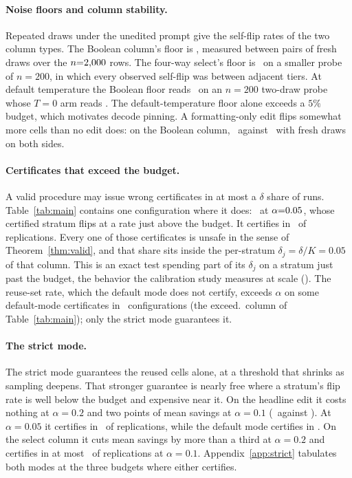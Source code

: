 \keeprunin
\paragraph{Noise floors and column stability.} Repeated draws under the
unedited prompt give the self-flip rates of the two column types. The Boolean column's floor
is \floorBool, measured between pairs of fresh draws over the
$n{=}2{,}000$ rows. The four-way select's floor is \floorSelect\ on a
smaller probe of $n{=}200$, in which every observed self-flip was
between adjacent tiers. At default temperature the Boolean floor reads
\floorDefaultT\ on an $n{=}200$ two-draw probe whose $T{=}0$ arm reads
\floorTzeroProbe. The default-temperature floor alone exceeds a $5\%$
budget, which motivates decode pinning. A formatting-only edit flips
somewhat more cells than no edit does: on the Boolean column,
\editFlipFreshBoth\ against \floorBool\ with fresh draws on both
sides.

\keeprunin
\paragraph{Certificates that exceed the budget.} A valid procedure
may issue wrong certificates in at most a $\delta$ share of runs.
Table~\ref{tab:main} contains one configuration where it does:
\tableUnsafeWorstPair\ at $\alpha{=}0.05$, whose
certified stratum flips at a rate just above the budget. It certifies
in \tableUnsafeWorstCert\ of replications. Every one of those
certificates is unsafe in the sense of Theorem~\ref{thm:valid}, and
that share sits inside the per-stratum $\delta_j = \delta/K = 0.05$ of
that column. This is an exact test spending part of its $\delta_j$ on a
stratum just past the budget, the behavior the calibration study
measures at scale (). The reuse-set rate,
which the default mode does not certify, exceeds $\alpha$ on some
default-mode certificates in \tableExceedConfigs\ configurations (the
exceed.\ column of Table~\ref{tab:main}); only the strict mode
guarantees it.

\keeprunin
\paragraph{The strict mode.} The strict mode guarantees the reused
cells alone, at a threshold that shrinks as sampling deepens. That
stronger guarantee is nearly free where a stratum's flip rate is well
below the budget and expensive near it. On the headline edit it costs
nothing at $\alpha{=}0.2$ and two points of mean savings at
$\alpha{=}0.1$ (\reuseSetSavingsTight\ against \frontierB). At
$\alpha{=}0.05$ it certifies in \reuseSetCertEdge\ of replications,
while the default mode certifies in \edgeCertRate. On the select column
it cuts mean savings by more than a third at $\alpha{=}0.2$ and
certifies in at most \reuseSetDjCertTightMax\ of replications at
$\alpha{=}0.1$. Appendix~\ref{app:strict} tabulates both modes at the
three budgets where either certifies.

